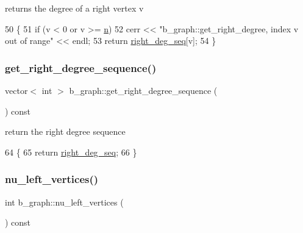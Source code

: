 returns the degree of a right vertex v 


\begin{DoxyCode}
50 \{
51   \textcolor{keywordflow}{if} (v < 0 or v >= \hyperlink{classb__graph_a9e211d40c1799bc9b125de472ff06642}{n})
52     cerr << \textcolor{stringliteral}{"b\_graph::get\_right\_degree, index v out of range"} << endl;
53   \textcolor{keywordflow}{return} \hyperlink{classb__graph_ae4c875ed6a583a78f38dfe958f20fad5}{right\_deg\_seq}[v];
54 \}
\end{DoxyCode}
\mbox{\label{classb__graph_a2711566385b92b02f4c03abdc1f9a582}} 
\subsubsection{\texorpdfstring{get\+\_\+right\+\_\+degree\+\_\+sequence()}{get\_right\_degree\_sequence()}}
{\footnotesize\ttfamily vector$<$ int $>$ b\+\_\+graph\+::get\+\_\+right\+\_\+degree\+\_\+sequence (\begin{DoxyParamCaption}{ }\end{DoxyParamCaption}) const}



return the right degree sequence 


\begin{DoxyCode}
64 \{
65   \textcolor{keywordflow}{return} \hyperlink{classb__graph_ae4c875ed6a583a78f38dfe958f20fad5}{right\_deg\_seq};
66 \}
\end{DoxyCode}
\mbox{\label{classb__graph_a5e71d5c97f2501b0b93c17146cf7e68e}} 
\subsubsection{\texorpdfstring{nu\+\_\+left\+\_\+vertices()}{nu\_left\_vertices()}}
{\footnotesize\ttfamily int b\+\_\+graph\+::nu\+\_\+left\+\_\+vertices (\begin{DoxyParamCaption}{ }\end{DoxyParamCaption}) const}




